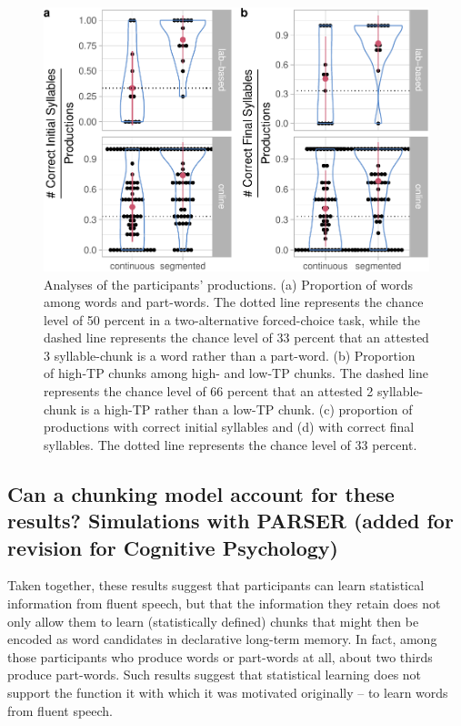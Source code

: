 \documentclass[
]{article}
\begin{document}
\begin{figure}

{\centering \includegraphics[width=0.8\linewidth]{segmentation_recall_combined_for_revision3_files/figure-latex/recall-w-pw-chunks-positions-plot-positions-1} 

}

\caption{Analyses of the participants' productions. (a) Proportion of words among words and part-words. The dotted line represents the chance level of 50 percent in a two-alternative forced-choice task, while the dashed line represents the chance level of 33 percent that an attested 3 syllable-chunk is a word rather than a part-word. (b) Proportion of high-TP chunks among high- and low-TP chunks. The dashed line represents the chance level of 66 percent that an attested 2 syllable-chunk is a high-TP rather than a low-TP chunk. (c) proportion of productions with correct initial syllables and (d) with correct final syllables. The dotted line represents the chance level of 33 percent.}\label{fig:recall-w-pw-chunks-positions-plot-positions}
\end{figure}

\clearpage

\subsection{Can a chunking model account for these results? Simulations
with PARSER (added for revision for Cognitive
Psychology)}\label{can-a-chunking-model-account-for-these-results-simulations-with-parser-added-for-revision-for-cognitive-psychology}

Taken together, these results suggest that participants can learn
statistical information from fluent speech, but that the information
they retain does not only allow them to learn (statistically defined)
chunks that might then be encoded as word candidates in declarative
long-term memory. In fact, among those participants who produce words or
part-words at all, about two thirds produce part-words. Such results
suggest that statistical learning does not support the function it with
which it was motivated originally -- to learn words from fluent speech.
\end{document}
